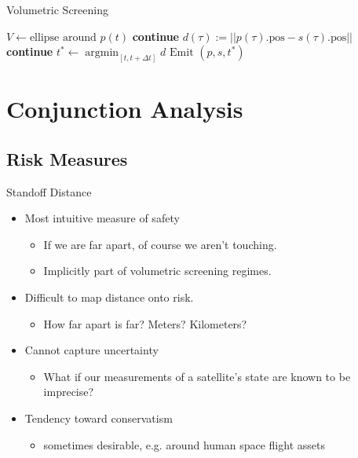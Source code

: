 \documentclass[pdf]{beamer}
\begin{document}
\begin{frame}{Volumetric Screening}
  \begin{algorithmic}
      \State $V \gets \text{ellipse around }p(t)$
        \State \textbf{continue}
      \EndIf
      \State $d(\tau) := || p(\tau).\text{pos}  - s(\tau).\text{pos} ||$
        \State \textbf{continue}
      \EndIf
      \State $t^* \gets \operatorname*{argmin}_{[t, t + \Delta t]} d$
      \State $\text{Emit } (p, s, t^*)$
    \EndFor
    \EndProcedure  
  \end{algorithmic}
\end{frame}

\section{Conjunction Analysis}
\subsection{Risk Measures}

\begin{frame}{Standoff Distance}
  \begin{itemize}
  \item Most intuitive measure of safety
    \begin{itemize}
    \item If we are far apart, of course we aren't touching.
    \item Implicitly part of volumetric screening regimes.
    \end{itemize}

  \item Difficult to map distance onto risk.
    \begin{itemize}
    \item How far apart is far? Meters? Kilometers?
    \end{itemize}
    
  \item Cannot capture uncertainty
    \begin{itemize}
    \item What if our measurements of a satellite's state are known to be imprecise?
    \end{itemize}
    
  \item Tendency toward conservatism
    \begin{itemize}
      \item sometimes desirable, e.g. around human space flight assets
    \end{itemize}
  \end{itemize}
\end{frame}
\end{document}
